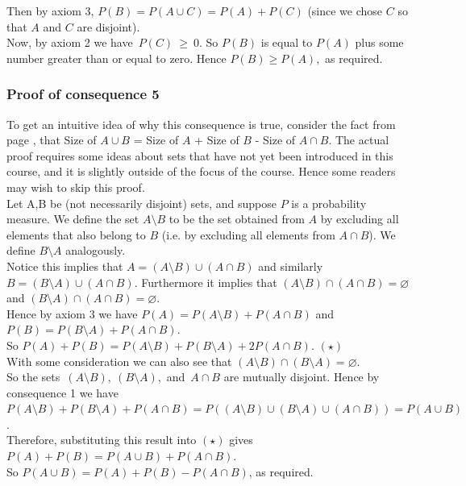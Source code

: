 	\noindent Then by axiom 3, $P(B) = P(A \cup C) = P(A) + P(C)$ (since we chose $C$ so that $A$ and $C$ are 
	disjoint). \\
	
	\noindent Now, by axiom 2 we have~$P(C)~\geq~0$. So $P(B)$ is equal to $P(A)$ plus some number greater than 
	or equal to zero. Hence $P(B) \geq P(A),$ as required.
	
	\subsubsection*{Proof of consequence 5}
	To get an intuitive idea of why this consequence is true, consider the fact from page \pageref{distributive law}, 
	that Size of $A\cup B$ = Size of $A$ + Size of $B$ - Size of $A \cap B$. The actual proof requires some ideas about 
	sets that have not yet been introduced in this course, and it is slightly outside of the focus of the course. Hence 
	some readers may wish to skip this proof. \\
	
	\noindent Let A,B be (not necessarily disjoint) sets, and suppose $P$ is a probability measure. We define the set 
	$A\setminus B$ to be the set obtained from $A$ by excluding all elements that also belong to $B$ (i.e. by 
	excluding all elements from $A \cap B$). We define $B\setminus A$ analogously. \\
	
	\noindent Notice this implies that $A =(A\setminus B) \cup (A \cap B)$ and similarly $B = (B\setminus A) \cup (A 
	\cap B)$. Furthermore it implies that $(A\setminus B) \cap (A \cap B) = \varnothing$ and $(B\setminus A) \cap (A 
	\cap B) = \varnothing$. \\
	
	\noindent Hence by axiom 3 we have $P(A) = P(A\setminus B) + P(A \cap B)$ and $P(B) = P(B\setminus A) + P(A 
	\cap B)$. \\
	
	\noindent So $P(A) + P(B) = P(A\setminus B) + P(B\setminus A) + 2P(A \cap B)$. \qquad $(\star)$ \\
	
	\noindent With some consideration we can also see that $(A\setminus B) \cap (B\setminus A) = \varnothing$. \\ 
	So the sets~$(A\setminus B),~(B\setminus A)$,~and~$A \cap B$ are mutually disjoint. Hence by consequence 1 
	we have $P(A\setminus B) + P(B\setminus A) + P(A \cap B) = P((A\setminus B) \cup (B\setminus A) \cup (A \cap B)) 
	= P(A \cup B)$. \\
	
	\noindent Therefore, substituting this result into $(\star)$ gives \\
	$P(A) + P(B) = P(A \cup B) + P(A \cap B)$. \\
	
	So  $P(A \cup B) = P(A) + P(B) - P(A \cap B)$, as required.
